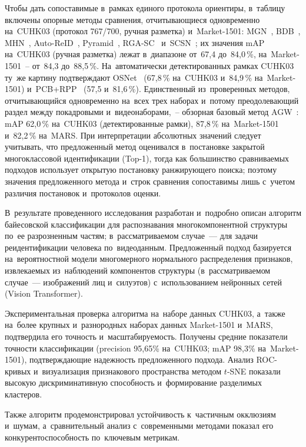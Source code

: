 Чтобы дать сопоставимые в~рамках единого протокола ориентиры, в~таблицу
включены опорные методы сравнения, отчитывающиеся одновременно на~CUHK03 (протокол
767/700, ручная разметка) и~Market-1501: MGN~\cite{Wang2018mgn},
BDB~\cite{Dai2019bdb}, MHN~\cite{Chen2019mhn},
Auto-ReID~\cite{Quan2019autoreid}, Pyramid~\cite{Zheng2019pyramid},
RGA-SC~\cite{Zhang2020rga} и~SCSN~\cite{Chen2020scsn}; их значения mAP
на~CUHK03 (ручная разметка) лежат в~диапазоне от~67,4 до~84,0\,\%, на~Market-1501~--
от~84,3 до~88,5\,\%. На~автоматически детектированных рамках CUHK03 ту~же картину подтверждают
OSNet~\cite{Zhou2019osnet} (67,8\,\% на~CUHK03 и~84,9\,\% на~Market-1501)
и~PCB+RPP~\cite{Sun2018pcb} (57,5 и~81,6\,\%). Единственный из~проверенных
методов, отчитывающийся одновременно на~всех трех наборах и~потому
преодолевающий раздел между покадровыми и~видеонаборами,~-- обзорная
базовый метод AGW~\cite{Ye2021reidsurvey}: mAP 62,0\,\% на~CUHK03
(детектированные рамки), 87,8\,\% на~Market-1501 и~82,2\,\% на~MARS. При интерпретации
абсолютных значений
следует учитывать, что предложенный метод оценивался в~постановке
закрытой многоклассовой идентификации (Top-1), тогда как большинство
сравниваемых подходов использует открытую постановку ранжирующего поиска;
поэтому значения предложенного метода и~строк сравнения сопоставимы лишь
с~учетом различия постановок и~протоколов оценки.

В~результате проведенного исследования разработан и~подробно описан
алгоритм байесовской классификации для распознавания многокомпонентной
структуры по~ее разрозненным частям; в~рассматриваемом случае~--- для
задачи реидентификации человека по~видеоданным. Предложенный подход
базируется на~вероятностной модели многомерного нормального
распределения признаков, извлекаемых из~наблюдений компонентов структуры
(в~рассматриваемом случае~--- изображений лиц и~силуэтов)
с~использованием нейронных сетей (Vision Transformer).

Экспериментальная проверка алгоритма на~наборе данных CUHK03,
а~также на~более крупных и~разнородных наборах данных Market-1501
и~MARS, подтвердила его точность
и~масштабируемость. Получены средние показатели точности
классификации (precision 95,65\% на~CUHK03; mAP 98,3\%
на~Market-1501), подтверждающие надежность предложенного подхода.
Анализ ROC-кривых и~визуализация признакового пространства методом
$t$-SNE показали высокую дискриминативную способность и~формирование
разделимых кластеров.

Также алгоритм продемонстрировал устойчивость к~частичным окклюзиям
и~шумам, а~сравнительный анализ с~современными методами показал его
конкурентоспособность по~ключевым метрикам.

